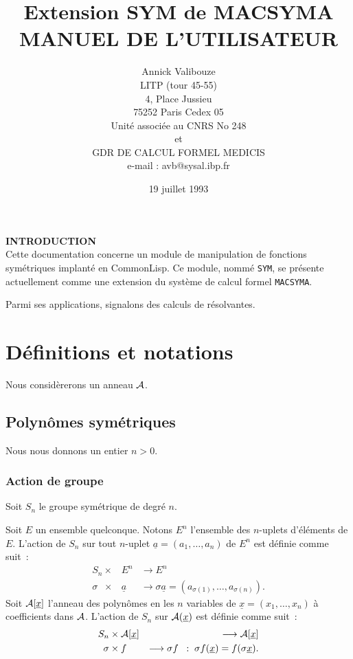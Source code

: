 \documentclass[11pt]{article}
\title{Extension SYM de MACSYMA\\
MANUEL DE L'UTILISATEUR}
\author{Annick Valibouze\\
LITP (tour 45-55)\\
4, Place Jussieu\\
75252 Paris Cedex 05\\
Unit\'e associ\'ee au CNRS No 248\\
et\\
GDR DE CALCUL FORMEL MEDICIS\\
\small{e-mail : avb@sysal.ibp.fr}}
\date{19 juillet 1993}
\begin{document}
\maketitle


\newpage
\noindent
{\bf INTRODUCTION}\\
Cette documentation concerne un module de manipulation de fonctions
sym\'etriques implant\'e en CommonLisp. Ce module, nomm\'e {\tt SYM},
se pr\'esente actuellement comme une extension du syst\`eme de calcul 
formel {\tt MACSYMA}. 

Parmi ses applications, signalons des calculs de r\'esolvantes.

\section{D\'{e}finitions et notations}
Nous consid\`ererons un anneau $\cal A$.
\subsection{Polyn\^omes sym\'etriques}
Nous nous donnons un entier $n > 0$.
\subsubsection*{Action de groupe}
Soit $S_n$ le groupe sym\'etrique de degr\'e $n$.

Soit $E$ un ensemble quelconque. Notons $E^n$ l'ensemble des
$n$-uplets d'\'el\'ements de $E$. L'action de $S_n$ sur tout $n$-uplet
$\underline a=(a_1,\ldots,a_n)$ de $E^n$ est d\'efinie comme suit~:
\begin{eqnarray*}
            S_n   \times & E^n &\longrightarrow  E^n\\
           \sigma \;\; \times & {\underline a} &  \longrightarrow 
                      \sigma{\underline a}=(a_{\sigma (1)},\ldots,a_{\sigma (n)}).
\end{eqnarray*}
Soit ${\cal A}[\underline x]$ l'anneau des polyn\^omes
en les $n$ variables
de $\underline x=(x_1,\ldots ,x_n)$ \`a coefficients dans $\cal A$. 
L'action de $S_n$ sur ${\cal A}(\underline x)$ est d\'efinie
comme suit~: 
\begin{eqnarray*}
            S_n & \times {\cal A}[\underline x] & \longrightarrow  {\cal A}[\underline x]\\
           \sigma & \times f  & \longrightarrow  \sigma f \;\; :\;
                      \sigma f({\underline x})=f(\sigma{\underline x}).
\end{eqnarray*}
\end{document}
